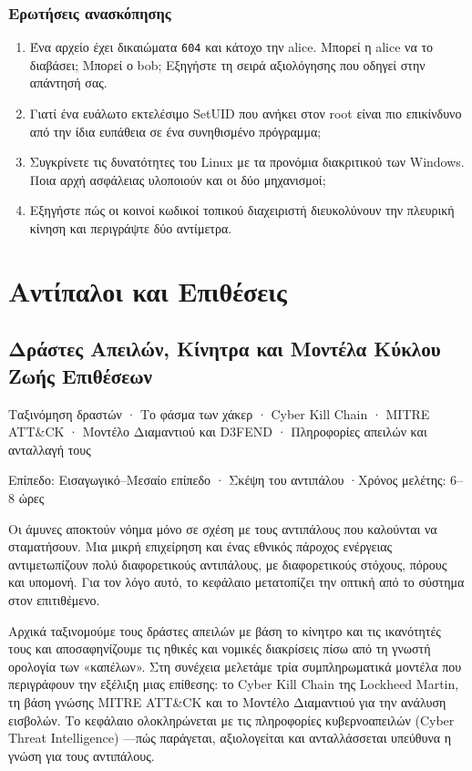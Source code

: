 \documentclass[11pt,openany]{book}
\newcommand{\chaptermeta}[3]{%
  {\sffamily\small\color{accent}#1\par}\vspace{0.3em}
  {\sffamily\footnotesize\color{gray}#2 \quad·\quad #3\par}\vspace{1.2em}}
\begin{document}
\section*{Ερωτήσεις ανασκόπησης}
\begin{enumerate}
  \item Ένα αρχείο έχει δικαιώματα \texttt{604} και κάτοχο την alice. Μπορεί η alice να το διαβάσει; Μπορεί ο bob; Εξηγήστε τη σειρά αξιολόγησης που οδηγεί στην απάντησή σας.
  \item Γιατί ένα ευάλωτο εκτελέσιμο SetUID που ανήκει στον root είναι πιο επικίνδυνο από την ίδια ευπάθεια σε ένα συνηθισμένο πρόγραμμα;
  \item Συγκρίνετε τις δυνατότητες του Linux με τα προνόμια διακριτικού των Windows. Ποια αρχή ασφάλειας υλοποιούν και οι δύο μηχανισμοί;
  \item Εξηγήστε πώς οι κοινοί κωδικοί τοπικού διαχειριστή διευκολύνουν την πλευρική κίνηση και περιγράψτε δύο αντίμετρα.
\end{enumerate}

\part{Αντίπαλοι και Επιθέσεις}
\chapter{Δράστες Απειλών, Κίνητρα και Μοντέλα Κύκλου Ζωής Επιθέσεων}\label{ch:3}
\chaptermeta{Ταξινόμηση δραστών · Το φάσμα των χάκερ · Cyber Kill Chain · MITRE ATT\&CK · Μοντέλο Διαμαντιού και D3FEND · Πληροφορίες απειλών και ανταλλαγή τους}{Επίπεδο: Εισαγωγικό–Μεσαίο επίπεδο · Σκέψη του αντιπάλου}{Χρόνος μελέτης: 6–8 ώρες}

Οι άμυνες αποκτούν νόημα μόνο σε σχέση με τους αντιπάλους που καλούνται να σταματήσουν. Μια μικρή επιχείρηση και ένας εθνικός πάροχος ενέργειας αντιμετωπίζουν πολύ διαφορετικούς αντιπάλους, με διαφορετικούς στόχους, πόρους και υπομονή. Για τον λόγο αυτό, το κεφάλαιο μετατοπίζει την οπτική από το σύστημα στον επιτιθέμενο.

Αρχικά ταξινομούμε τους δράστες απειλών με βάση το κίνητρο και τις ικανότητές τους και αποσαφηνίζουμε τις ηθικές και νομικές διακρίσεις πίσω από τη γνωστή ορολογία των «καπέλων». Στη συνέχεια μελετάμε τρία συμπληρωματικά μοντέλα που περιγράφουν την εξέλιξη μιας επίθεσης: το Cyber Kill Chain της Lockheed Martin, τη βάση γνώσης MITRE ATT\&CK και το Μοντέλο Διαμαντιού για την ανάλυση εισβολών. Το κεφάλαιο ολοκληρώνεται με τις πληροφορίες κυβερνοαπειλών (Cyber Threat Intelligence) —πώς παράγεται, αξιολογείται και ανταλλάσσεται υπεύθυνα η γνώση για τους αντιπάλους.
\end{document}
